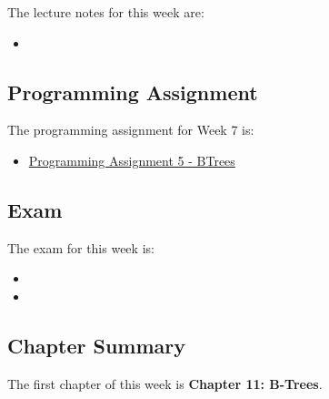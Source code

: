 The lecture notes for this week are:

\begin{itemize}
    \item {}
\end{itemize}

\subsection{Programming Assignment}

The programming assignment for Week 7 is:

\begin{itemize}
    \item \href{https://github.com/QuantumCompiler/CU/tree/main/CSPB%202270%20-%20Data%20Structures/Assignments/Assignment%205%20-%20B-Trees}{Programming Assignment 5 - BTrees}
\end{itemize}

\subsection{Exam}

The exam for this week is:

\begin{itemize}
    \item {}
    \item {}
\end{itemize}

\subsection{Chapter Summary}

The first chapter of this week is \textbf{Chapter 11: B-Trees}.

